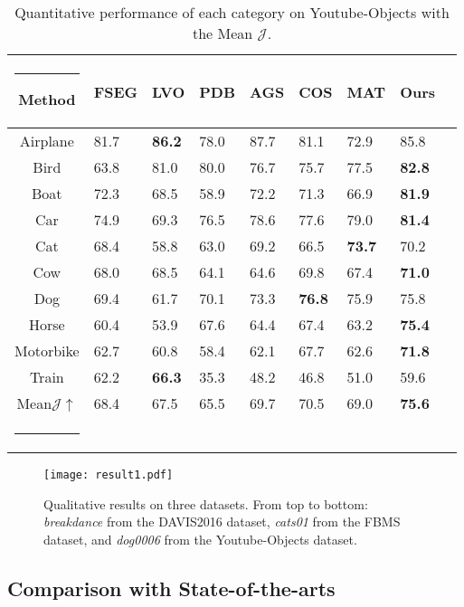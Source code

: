 \documentclass[letterpaper]{article} \usepackage{aaai20}  \usepackage{times}  \usepackage{helvet} \usepackage{courier}  \usepackage[hyphens]{url}  \usepackage{graphicx} \urlstyle{rm} \def\UrlFont{\rm}  \usepackage{graphicx}  \frenchspacing  \setlength{\pdfpagewidth}{8.5in}  \setlength{\pdfpageheight}{11in}  \usepackage{amssymb}
\makeatletter
\def\hlinew#1{\noalign{\ifnum0=`}\fi\hrule \@height #1 \futurelet
   \reserved@a\@xhline}
\makeatother
\begin{document}
\begin{table}[t!]
\small
    \centering
    \caption{Quantitative performance of each category on Youtube-Objects with the Mean $\mathcal{J}$.}
    \begin{tabular}{c||p{0.5cm}p{0.5cm}p{0.5cm}p{0.5cm}p{0.5cm}p{0.5cm}p{0.5cm}p{0.5cm}}
    \hlinew{1pt}
    Method & FSEG & LVO & PDB & AGS & COS & MAT & Ours \\ \hline \hline
    Airplane & 81.7 & \textbf{86.2} & 78.0 & 87.7 & 81.1 & 72.9 & 85.8 \\
    Bird & 63.8 & 81.0 & 80.0 & 76.7 & 75.7 & 77.5 & \textbf{82.8} \\
    Boat & 72.3 & 68.5 & 58.9 & 72.2 & 71.3 & 66.9 & \textbf{81.9} \\
    Car & 74.9 & 69.3 & 76.5 & 78.6 & 77.6 & 79.0 & \textbf{81.4} \\
    Cat & 68.4 & 58.8 & 63.0 & 69.2 & 66.5 & \textbf{73.7} & 70.2 \\
    Cow & 68.0 & 68.5 & 64.1 & 64.6 & 69.8 & 67.4 & \textbf{71.0} \\
    Dog & 69.4 & 61.7 & 70.1 & 73.3 & \textbf{76.8} & 75.9 & 75.8 \\
    Horse & 60.4 & 53.9 & 67.6 & 64.4 & 67.4 & 63.2 & \textbf{75.4} \\
    Motorbike & 62.7 & 60.8 & 58.4 & 62.1 & 67.7 & 62.6 & \textbf{71.8} \\
    Train & 62.2 & \textbf{66.3} & 35.3 & 48.2 & 46.8 & 51.0 & 59.6 \\ \hline
    Mean$\mathcal{J}\uparrow$ & 68.4 & 67.5 & 65.5 & 69.7 & 70.5 & 69.0 & \textbf{75.6} \\ \hlinew{1pt}
    \end{tabular}
    \label{tab:youtube}
    \vspace{-12pt}
\end{table}

\begin{figure*}[t!]
\centering
\texttt{[image: result1.pdf]}
\caption{Qualitative results on three datasets. From top to bottom: \textit{breakdance} from the DAVIS2016 dataset, \textit{cats01} from the
FBMS dataset, and \textit{dog0006} from the Youtube-Objects dataset.}
\label{fig:result1}
\vspace{-12pt}
\end{figure*}

\subsection{Comparison with State-of-the-arts}
\end{document}
